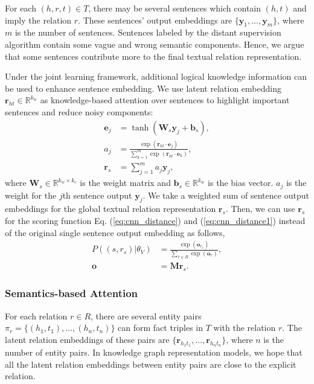 \documentclass[letterpaper]{article} %
\begin{document}
For each $(h, r, t) \in T$, there may be several sentences which contain $(h, t)$ and imply the relation $r$. These sentences' output embeddings are $\{\mathbf{y}_1, \ldots , \mathbf{y}_m\}$, where $m$ is the number of sentences. Sentences labeled by the distant supervision algorithm contain some vague and wrong semantic components. Hence, we argue that some sentences contribute more to the final textual relation representation. 

Under the joint learning framework, additional logical knowledge information can be used to enhance sentence embedding. We use latent relation embedding $\mathbf{r}_{ht} \in \mathbb{R}^{k_w} $ as knowledge-based attention over sentences to highlight important sentences and reduce noisy components:
\begin{align}
\label{eq:att_k}
\mathbf{e}_j & = \tanh(\mathbf{W}_s\mathbf{y}_j+\mathbf{b}_s), \\\nonumber
a_j & =\frac{\exp(\mathbf{r}_{ht}\cdot\mathbf{e}_j)}{\sum_{k = 1}^{m} \exp(\mathbf{r}_{ht}\cdot\mathbf{e}_k)}, \\\nonumber
\mathbf{r}_s & = \sum_{j = 1}^{m} a_j\mathbf{y}_j,
\end{align}
where $\mathbf{W}_s \in \mathbb{R}^{k_w \times k_c}$ is the weight matrix and $\mathbf{b}_s \in \mathbb{R}^{k_w}$ is the bias vector. $a_j$ is the weight for the $j$th sentence output $\mathbf{y}_j$. We take a weighted sum of sentence output embeddings for the global textual relation representation $\mathbf{r}_s$. Then, we can use $\mathbf{r}_s$ for the scoring function Eq. (\ref{eq:cnn_distance}) and (\ref{eq:cnn_distance1}) instead of the original single sentence output embedding as follows,
\begin{align}
P((s, r_s)|{\theta_V}) &= \frac{\exp(\mathbf{o}_{r_s})}{\sum_{r \in R} \exp(\mathbf{o}_{r})},	\\\nonumber
\mathbf{o} &= \mathbf{M}\mathbf{r}_s.
\end{align}

\subsubsection{Semantics-based Attention}

For each relation $r \in R$, there are several entity pairs $\pi_r = \{(h_1, t_1), \ldots , (h_n, t_n)\}$ can form fact triples in $T$ with the relation $r$. The latent relation embeddings of these pairs are $\{\mathbf{r}_{h_1t_1}, \ldots , \mathbf{r}_{h_nt_n}\}$, where $n$ is the number of entity pairs. In knowledge graph representation models, we hope that all the latent relation embeddings between entity pairs are close to the explicit relation. 
\end{document}
